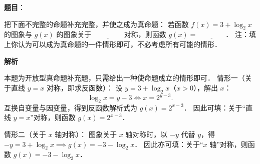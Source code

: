 \begin{answer}

\textbf{题目}：

把下面不完整的命题补充完整，并使之成为真命题：
若函数 $f(x) = 3 + \log_2 x$ 的图象与 $g(x)$ 的图象关于 $\underline{\qquad\qquad}$ 对称，则函数 $g(x) = \underline{\qquad\qquad}$．
注：填上你认为可以成为真命题的一件情形即可，不必考虑所有可能的情形．

\textbf{解析}

本题为开放型真命题补充题，只需给出一种使命题成立的情形即可．
情形一（关于直线 $y = x$ 对称，即求反函数）：
设 $y = 3 + \log_2 x$（$x > 0$），解出 $x$：
\nopagebreak[4]
\[
\log_2 x = y - 3 \iff x = 2^{y-3}.
\]
互换自变量与因变量，得到反函数解析式为 $g(x) = 2^{x-3}$．
因此可填：关于“直线 $y = x$”对称，则函数 $g(x) = 2^{x-3}$．

情形二（关于 $x$ 轴对称）：
图象关于 $x$ 轴对称时，以 $-y$ 代替 $y$，得 $-y = 3 + \log_2 x \implies g(x) = -3 - \log_2 x$．
因此亦可填：关于“$x$ 轴”对称，则函数 $g(x) = -3 - \log_2 x$．


\end{answer}
